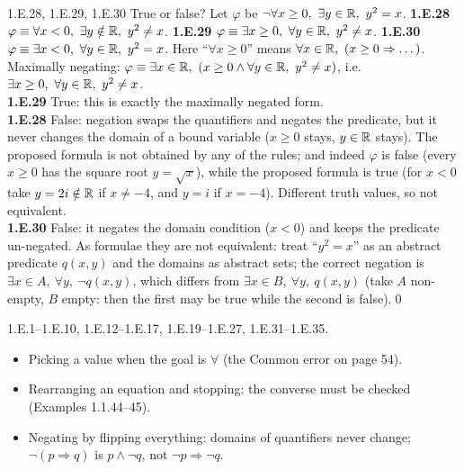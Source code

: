 \begin{bookex}[recommended]{1.E.28, 1.E.29, 1.E.30}
True or false? Let $\varphi$ be $\neg\forall x\ge0,\ \exists y\in\R,\ y^2=x$. \textbf{1.E.28} $\varphi\equiv\forall x<0,\ \exists y\notin\R,\ y^2\ne x$. \textbf{1.E.29} $\varphi\equiv\exists x\ge0,\ \forall y\in\R,\ y^2\ne x$. \textbf{1.E.30} $\varphi\equiv\exists x<0,\ \forall y\in\R,\ y^2=x$.
\solution
Here ``$\forall x\ge0$'' means $\forall x\in\R,\ (x\ge0\Rightarrow\dots)$. Maximally negating: $\varphi\equiv\exists x\in\mathbb{R},\ (x\ge0\wedge\forall y\in\mathbb{R},\ y^2\ne x)$, i.e.\ $\exists x\ge0,\ \forall y\in\mathbb{R},\ y^2\ne x$.\\
\textbf{1.E.29} True: this is exactly the maximally negated form.\\
\textbf{1.E.28} False: negation swaps the quantifiers and negates the predicate, but it never changes the domain of a bound variable ($x\ge0$ stays, $y\in\mathbb{R}$ stays). The proposed formula is not obtained by any of the rules; and indeed $\varphi$ is false (every $x\ge0$ has the square root $y=\sqrt x$), while the proposed formula is true (for $x<0$ take $y=2i\notin\mathbb{R}$ if $x\ne-4$, and $y=i$ if $x=-4$). Different truth values, so not equivalent.\\
\textbf{1.E.30} False: it negates the domain condition ($x<0$) and keeps the predicate un-negated. As formulae they are not equivalent: treat ``$y^2=x$'' as an abstract predicate $q(x,y)$ and the domains as abstract sets; the correct negation is $\exists x\in A,\ \forall y,\ \neg q(x,y)$, which differs from $\exists x\in B,\ \forall y,\ q(x,y)$ (take $A$ non-empty, $B$ empty: then the first may be true while the second is false).\qed
\end{bookex}

\begin{trybox}
1.E.1--1.E.10, 1.E.12--1.E.17, 1.E.19--1.E.27, 1.E.31--1.E.35.
\end{trybox}

\begin{warn}
\begin{itemize}
\item Picking a value when the goal is $\forall$ (the Common error on page 54).
\item Rearranging an equation and stopping: the converse must be checked (Examples 1.1.44--45).
\item Negating by flipping everything: domains of quantifiers never change; $\neg(p\Rightarrow q)$ is $p\wedge\neg q$, not $\neg p\Rightarrow\neg q$.
\end{itemize}
\end{warn}
